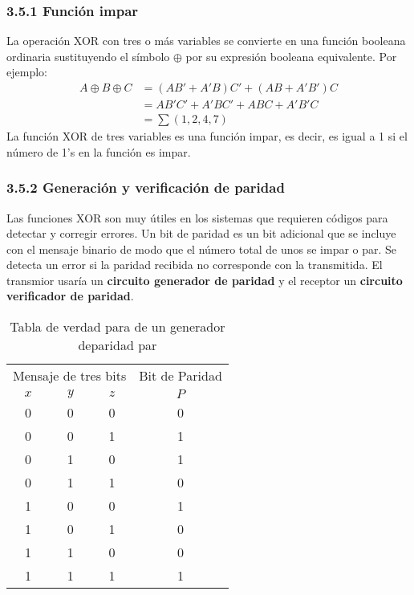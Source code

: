 \subsubsection*{3.5.1 Funci\'{o}n impar}
La operaci\'{o}n XOR con tres o m\'{a}s variables se convierte en una funci\'{o}n booleana
ordinaria sustituyendo el s\'{i}mbolo $\oplus$ por su expresi\'{o}n booleana equivalente.
Por ejemplo:
\begin{align*}
    A \oplus B \oplus C & = (AB' + A'B)C' + (AB + A'B')C \\
                        & = AB'C' + A'BC' + ABC + A'B'C  \\
                        & = \sum (1, 2, 4, 7)
\end{align*}
La funci\'{o}n XOR de tres variables es una funci\'{o}n impar, es decir, es igual a 1 si el
n\'{u}mero de 1's en la funci\'{o}n es impar.

\subsubsection*{3.5.2 Generaci\'{o}n y verificaci\'{o}n de paridad}
Las funciones XOR son muy \'{u}tiles en los sistemas que requieren c\'{o}digos para
detectar y corregir errores. Un bit de paridad es un bit adicional que se incluye con
el mensaje binario de modo que el n\'{u}mero total de unos se impar o par. Se detecta
un error si la paridad recibida no corresponde con la transmitida. El transmior usar\'{i}a
un \textbf{circuito generador de paridad} y el receptor un \textbf{circuito verificador de paridad}.

\begin{table}[h]
    \centering
    \begin{tabular}{cccc}
        \multicolumn{3}{c}{Mensaje de tres bits} & Bit de Paridad             \\
        \cmidrule{1-3} \cmidrule{4-4} $x$        & $y$            & $z$ & $P$ \\
        \midrule 0                               & 0              & 0   & 0   \\ 0 & 0 & 1 & 1 \\ 0 & 1 & 0 & 1 \\ 0 & 1 & 1 & 0 \\
        1                                        & 0              & 0   & 1   \\
        1                                        & 0              & 1   & 0   \\
        1                                        & 1              & 0   & 0   \\
        1                                        & 1              & 1   & 1   \\
        \bottomrule
    \end{tabular}
    \caption{Tabla de verdad para de un generador deparidad par}
\end{table}